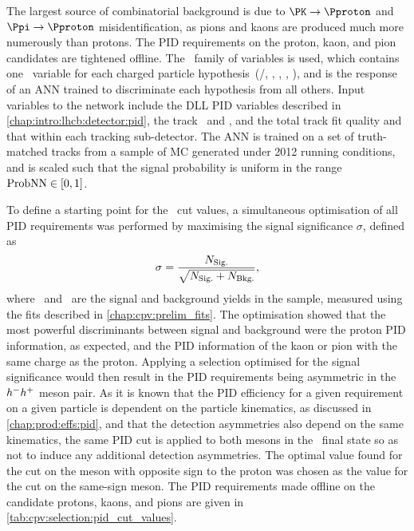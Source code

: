 The largest source of combinatorial background is due to $\PK \to \Pproton$ and 
$\Ppi \to \Pproton$ misidentification, as pions and kaons are produced much 
more numerously than protons.
The \ac{PID} requirements on the proton, kaon, and pion candidates are 
tightened offline.
The \probnn\ family of variables is used, which contains one \probnn\ variable 
for each charged particle hypothesis~(\Pproton/\APproton, \PKpm, \Ppipm, 
\Pmupm, \Pepm), and is the response of an \ac{ANN} trained to discriminate each 
hypothesis from all others.
Input variables to the network include the \ac{DLL} \ac{PID} variables 
described in \cref{chap:intro:lhcb:detector:pid}, the track \ptot\ and \pT, and 
the total track fit quality and that within each tracking sub-detector.
The \ac{ANN} is trained on a set of truth-matched tracks from a sample of 
\ac{MC} generated under 2012 running conditions, and is scaled such that the 
signal probability is uniform in the range $\text{ProbNN} \in [0, 1]$.

To define a starting point for the \probnn\ cut values, a simultaneous 
optimisation of all \ac{PID} requirements was performed by maximising the 
signal significance $\sigma$, defined as
\begin{equation}
  \sigma = \frac{%
    \nsig
  }{%
    \sqrt{\nsig + \nbkg}
  },
  \label{eqn:cpv:selection:signal_significance}
\end{equation}
where \nsig\ and \nbkg\ are the signal and background yields in the sample, 
measured using the fits described in \cref{chap:cpv:prelim_fits}.
The optimisation showed that the most powerful discriminants between signal and 
background were the proton \ac{PID} information, as expected, and the \ac{PID} 
information of the kaon or pion with the same charge as the proton.
Applying a selection optimised for the signal significance would then result in 
the \ac{PID} requirements being asymmetric in the $h^{-}h^{+}$ meson pair.
As it is known that the \ac{PID} efficiency for a given requirement on a given 
particle is dependent on the particle kinematics, as discussed in 
\cref{chap:prod:effs:pid}, and that the detection asymmetries also depend on 
the same kinematics, the same \ac{PID} cut is applied to both mesons in the 
\PLambdac\ final state so as not to induce any additional detection 
asymmetries.
The optimal value found for the cut on the meson with opposite sign to the 
proton was chosen as the value for the cut on the same-sign meson.
The \ac{PID} requirements made offline on the candidate protons, kaons, and 
pions are given in \cref{tab:cpv:selection:pid_cut_values}.

